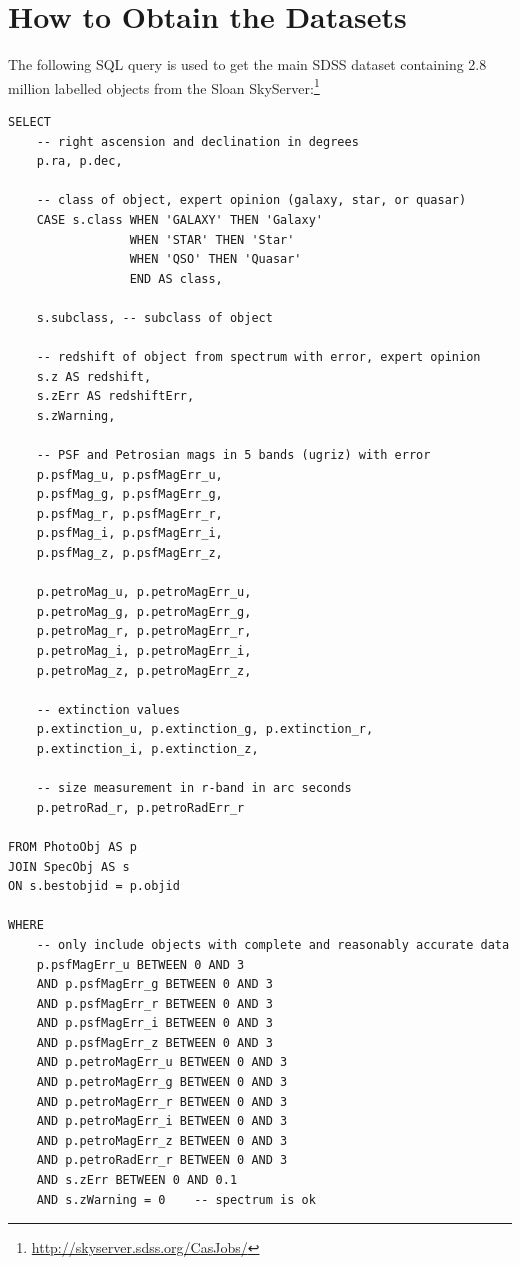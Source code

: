 
\appendix

\chapter{How to Obtain the Datasets}
\label{cha:datasets}

The following SQL query is used to get the main SDSS dataset containing 2.8 million
labelled objects from the Sloan SkyServer:\footnote{
	\url{http://skyserver.sdss.org/CasJobs/}}

\begin{verbatim}
SELECT
	-- right ascension and declination in degrees
	p.ra, p.dec,
	
	-- class of object, expert opinion (galaxy, star, or quasar)
	CASE s.class WHEN 'GALAXY' THEN 'Galaxy'
				 WHEN 'STAR' THEN 'Star'
				 WHEN 'QSO' THEN 'Quasar'
				 END AS class,
	
	s.subclass, -- subclass of object
	
	-- redshift of object from spectrum with error, expert opinion
	s.z AS redshift,
	s.zErr AS redshiftErr,
	s.zWarning,
	
	-- PSF and Petrosian mags in 5 bands (ugriz) with error
	p.psfMag_u, p.psfMagErr_u,
	p.psfMag_g, p.psfMagErr_g,
	p.psfMag_r, p.psfMagErr_r,
	p.psfMag_i, p.psfMagErr_i,
	p.psfMag_z, p.psfMagErr_z,
	
	p.petroMag_u, p.petroMagErr_u,
	p.petroMag_g, p.petroMagErr_g,
	p.petroMag_r, p.petroMagErr_r,
	p.petroMag_i, p.petroMagErr_i,
	p.petroMag_z, p.petroMagErr_z,
	
	-- extinction values
	p.extinction_u, p.extinction_g, p.extinction_r,
	p.extinction_i, p.extinction_z,
	
	-- size measurement in r-band in arc seconds
	p.petroRad_r, p.petroRadErr_r

FROM PhotoObj AS p
JOIN SpecObj AS s
ON s.bestobjid = p.objid

WHERE
	-- only include objects with complete and reasonably accurate data
	p.psfMagErr_u BETWEEN 0 AND 3
	AND p.psfMagErr_g BETWEEN 0 AND 3
	AND p.psfMagErr_r BETWEEN 0 AND 3
	AND p.psfMagErr_i BETWEEN 0 AND 3
	AND p.psfMagErr_z BETWEEN 0 AND 3
	AND p.petroMagErr_u BETWEEN 0 AND 3
	AND p.petroMagErr_g BETWEEN 0 AND 3
	AND p.petroMagErr_r BETWEEN 0 AND 3
	AND p.petroMagErr_i BETWEEN 0 AND 3
	AND p.petroMagErr_z BETWEEN 0 AND 3
	AND p.petroRadErr_r BETWEEN 0 AND 3
	AND s.zErr BETWEEN 0 AND 0.1
	AND s.zWarning = 0    -- spectrum is ok
\end{verbatim}



